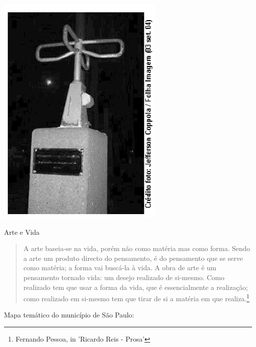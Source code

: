 \documentclass[10pt,a4paper]{article}
\newenvironment{Figure}
  {\par\medskip\noindent\minipage{\linewidth}}
  {\endminipage\par\medskip}
\begin{document}
\begin{multicols}{2}
\begin{enumerate}
\begin{Figure}
     \includegraphics[width=\linewidth]{catraca_geografia.jpg}
\end{Figure}
	
	\begin{center} Arte e Vida \end{center}
	\begin{quote}
	A arte baseia-se na vida, por\'em n\~ao como mat\'eria mas como forma. Sendo a arte um produto directo do pensamento, \'e do pensamento que se serve como mat\'eria; a forma vai busc\'a-la \`a vida. A obra de arte \'e um pensamento tornado vida: um desejo realizado de si-mesmo. Como realizado tem que usar a forma da vida, que \'e essencialmente a realiza\c{c}\~ao; como realizado em si-mesmo tem que tirar de si a mat\'eria em que realiza.\footnote{ Fernando Pessoa, in 'Ricardo Reis - Prosa'}
	\end{quote}
	Mapa tem\'atico do munic\'ipio de S\~ao Paulo:


\end{enumerate}
\end{multicols}
\end{document}
